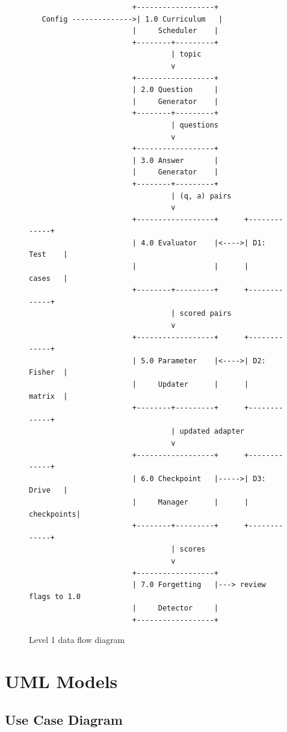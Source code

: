 \documentclass[12pt,a4paper]{report}
\begin{document}
\begin{figure}[htbp]
\centering
\begin{verbatim}
                        +------------------+
   Config -------------->| 1.0 Curriculum   |
                        |     Scheduler    |
                        +--------+---------+
                                 | topic
                                 v
                        +------------------+
                        | 2.0 Question     |
                        |     Generator    |
                        +--------+---------+
                                 | questions
                                 v
                        +------------------+
                        | 3.0 Answer       |
                        |     Generator    |
                        +--------+---------+
                                 | (q, a) pairs
                                 v
                        +------------------+      +-------------+
                        | 4.0 Evaluator    |<---->| D1: Test    |
                        |                  |      |     cases   |
                        +--------+---------+      +-------------+
                                 | scored pairs
                                 v
                        +------------------+      +-------------+
                        | 5.0 Parameter    |<---->| D2: Fisher  |
                        |     Updater      |      |     matrix  |
                        +--------+---------+      +-------------+
                                 | updated adapter
                                 v
                        +------------------+      +-------------+
                        | 6.0 Checkpoint   |----->| D3: Drive   |
                        |     Manager      |      |  checkpoints|
                        +--------+---------+      +-------------+
                                 | scores
                                 v
                        +------------------+
                        | 7.0 Forgetting   |---> review flags to 1.0
                        |     Detector     |
                        +------------------+
\end{verbatim}
\caption{Level 1 data flow diagram}
\end{figure}

\section{UML Models}

\subsection{Use Case Diagram}
\end{document}
